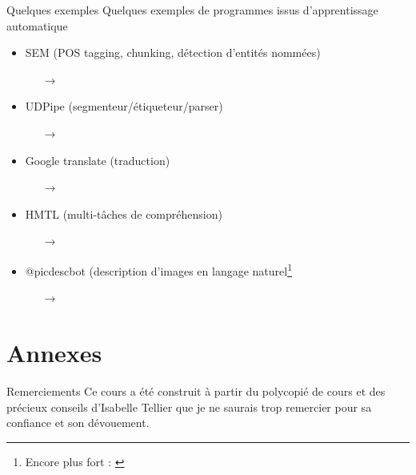\documentclass[hyperref={unicode}, xcolor={svgnames}, french]{beamer}
\begin{document}
\begin{frame}{Quelques exemples}
    Quelques exemples de programmes issus d'apprentissage automatique
    \begin{itemize}
        \item SEM (POS tagging, chunking, détection d'entités nommées)
            \begin{itemize}
                \item[→] 
            \end{itemize}
        \item UDPipe (segmenteur/étiqueteur/parser)
            \begin{itemize}
                \item[→] 
            \end{itemize}
        \item Google translate (traduction)
            \begin{itemize}
                \item[→] 
            \end{itemize}
        \item HMTL (multi-tâches de compréhension)
            \begin{itemize}
                \item[→] 
            \end{itemize}
        \item @picdescbot (description d'images en langage naturel\footnote{Encore plus fort :  \parencite{alishahi2017encoding}}
            \begin{itemize}
                \item[→] 
            \end{itemize}
    \end{itemize}
\end{frame}


\appendix
{}  %
\section{Annexes}
\begin{frame}{Remerciements}
    Ce cours a été construit à partir du polycopié de cours  \parencite{tellier2017fouille} et des précieux conseils d'Isabelle Tellier que je ne saurais trop remercier pour sa confiance et son dévouement.
\end{frame}
\end{document}
